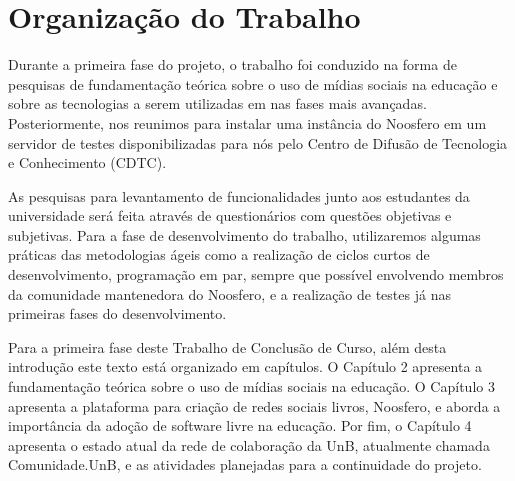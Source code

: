 
\section{Organização do Trabalho}

Durante a primeira fase do projeto, o trabalho foi conduzido na forma de
pesquisas de fundamentação teórica sobre o uso de mídias sociais na educação
e sobre as tecnologias a serem utilizadas em nas fases mais avançadas.
Posteriormente, nos reunimos para instalar uma instância do Noosfero em um
servidor de testes disponibilizadas para nós pelo Centro de Difusão de
Tecnologia e Conhecimento (CDTC). 

As pesquisas para levantamento de funcionalidades junto aos estudantes
da universidade será feita através de questionários com questões objetivas
e subjetivas.
%
Para a fase de desenvolvimento do trabalho, utilizaremos algumas práticas das
metodologias ágeis como a realização de ciclos curtos de desenvolvimento,
programação em par, sempre que possível envolvendo membros da comunidade
mantenedora do Noosfero, e a realização de testes já nas primeiras fases do
desenvolvimento.

Para a primeira fase deste Trabalho de Conclusão de Curso, além desta introdução
este texto está organizado em capítulos. O Capítulo 2 apresenta a fundamentação
teórica sobre o uso de mídias sociais na educação. O Capítulo 3 apresenta
a plataforma para criação de redes sociais livros, Noosfero, e aborda a
importância da adoção de software livre na educação. Por fim, o Capítulo 4
apresenta o estado atual da rede de colaboração da UnB, atualmente chamada
Comunidade.UnB, e as atividades planejadas para a continuidade do projeto.
